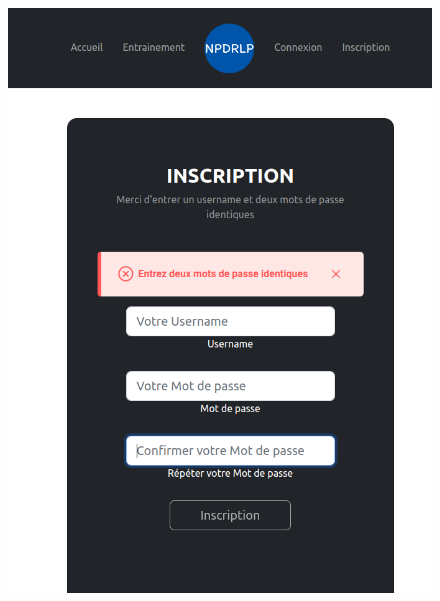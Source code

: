 \documentclass[12pt,french]{article}
\begin{document}
\begin{figure}[H]
	\centering
	\begin{minipage}{.5\textwidth}
		\centering
		\includegraphics[scale=0.25]{inscri1.png}
	\end{minipage}%
	\begin{minipage}{.5\textwidth}
		\centering

\end{minipage}
\end{figure}
\end{document}
